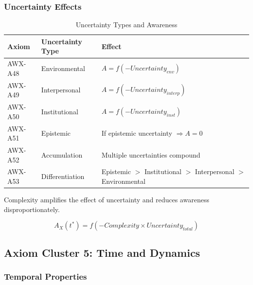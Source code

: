 \subsubsection{Uncertainty Effects}

\begin{table}[htbp]
\centering
\caption{Uncertainty Types and Awareness}
\label{tab:uncertainty-effects}
\renewcommand{\arraystretch}{1.3}
\begin{tabular}{@{}lll@{}}
\toprule
\textbf{Axiom} & \textbf{Uncertainty Type} & \textbf{Effect} \\
\midrule
AWX-A48 & Environmental & $A = f(-Uncertainty_{env})$ \\
AWX-A49 & Interpersonal & $A = f(-Uncertainty_{interp})$ \\
AWX-A50 & Institutional & $A = f(-Uncertainty_{inst})$ \\
AWX-A51 & Epistemic & If epistemic uncertainty $\Rightarrow A = 0$ \\
AWX-A52 & Accumulation & Multiple uncertainties compound \\
AWX-A53 & Differentiation & Epistemic $>$ Institutional $>$ Interpersonal $>$ Environmental \\
\bottomrule
\end{tabular}
\end{table}

\begin{axiom}
\label{ax:awx-a54}
Complexity amplifies the effect of uncertainty and reduces awareness disproportionately.
\end{axiom}

\begin{equation}
A_X(t^*) = f(-Complexity \times Uncertainty_{total})
\end{equation}

\subsection{Axiom Cluster 5: Time and Dynamics}
\label{subsec:axioms-time}

\subsubsection{Temporal Properties}

